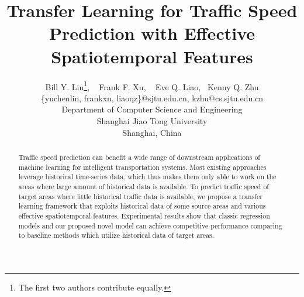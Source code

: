 \documentclass{article}
\title{Transfer Learning for Traffic Speed Prediction with Effective Spatiotemporal Features}
\author{
	Bill Y. Lin\thanks{The first two authors contribute equally.}, ~
	Frank F. Xu\footnotemark[1], ~ Eve Q. Liao,~
	Kenny Q. Zhu
	\\[0.5ex]
	{\{yuchenlin, frankxu, liaoqz\}@sjtu.edu.cn, kzhu@cs.sjtu.edu.cn}\\[0.5ex]
	Department of Computer Science and Engineering\\[0.5ex]
	Shanghai Jiao Tong University\\[0.5ex]
 Shanghai, China
}
\begin{document}

\maketitle

\begin{abstract}
Traffic speed prediction can benefit a wide range of downstream applications of machine learning for intelligent transportation systems. 
Most existing approaches leverage historical time-series data, which thus makes them only able to work on the areas where large amount of historical data is available. 
To predict traffic speed of target areas where little historical traffic data is available, 
we propose a transfer learning framework that exploits historical data of some source areas and various effective spatiotemporal features.
Experimental results show that classic regression models and our proposed novel model can achieve competitive performance comparing to baseline methods which utilize historical data of target areas.
\end{abstract}







%
%


\end{document}

